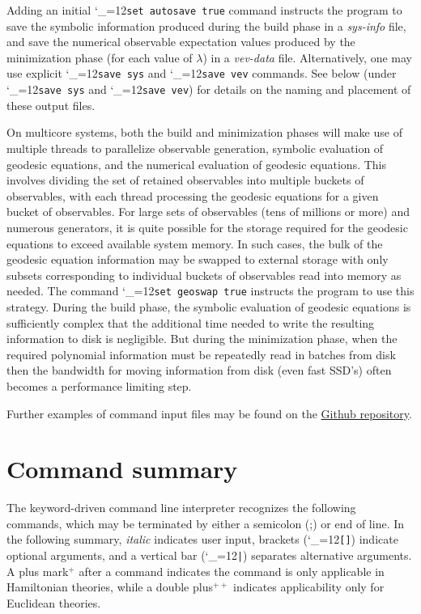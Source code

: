 \documentclass [12pt]{article}
\makeatletter
\renewcommand{\tt}{\begingroup\catcode`_=12\def\_{\string_}\tt@}
\newcommand{\tt@}[1]{\texttt{#1}\endgroup}
\makeatother
\begin{document}
Adding an initial \tt{set autosave true} command instructs the program to
save the symbolic information produced during the build phase in
a \textit{sys-info} file, and save the numerical observable expectation
values produced by the minimization phase (for each value of $\lambda$)
in a \textit{vev-data} file.
Alternatively, one may use explicit \tt{save sys} and \tt{save vev} commands.
See below (under \tt{save sys} and \tt{save vev}) for details on the
naming and placement of these output files.

On multicore systems, both the build and minimization phases will make use
of multiple threads to parallelize observable generation, symbolic evaluation
of geodesic equations, and the numerical evaluation of geodesic equations.
This involves dividing the set of retained observables into multiple buckets
of observables, with each thread processing the geodesic equations for
a given bucket of observables.
For large sets of observables (tens of millions or more) and numerous generators,
it is quite possible for the storage required for the geodesic equations to
exceed available system memory.
In such cases,
the bulk of the geodesic equation information may be swapped to
external storage with only subsets corresponding to individual buckets of
observables read into memory as needed.
The command \tt{set geoswap true} instructs the program to use this strategy.
During the build phase, the symbolic evaluation of geodesic equations is 
sufficiently complex that the additional time needed to write the resulting
information to disk is negligible.
But during the minimization phase, 
when the required polynomial information must be repeatedly read in batches
from disk then the bandwidth for moving information from disk (even fast SSD's)
often becomes a performance limiting step.

Further examples of command input files may be found on the
\href{https://github.com/lgyaffe/Gordion/blob/main/input-examples}
{Github repository}.

\section {Command summary}\label{sec:commands}

The keyword-driven command line interpreter recognizes the following commands,
which may be terminated by either a semicolon (;) or end of line.
In the following summary,
\textit{italic} indicates user input,
brackets (\tt{[]}) indicate optional arguments,
and a vertical bar (\tt{|}) separates alternative arguments.
A plus mark$^+$ after a command indicates the command is only
applicable in Hamiltonian theories, while a double plus$^{++}$
indicates applicability only for Euclidean theories.
\end{document}
